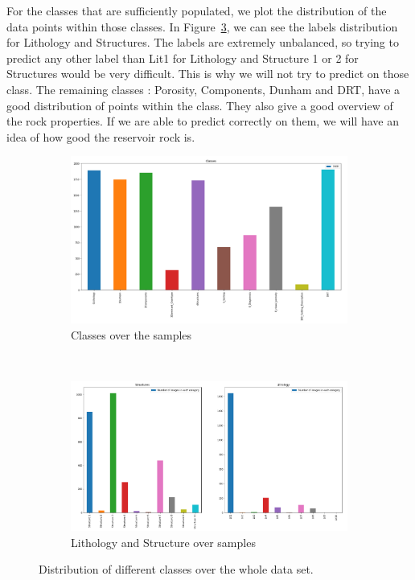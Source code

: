  For the classes that are sufficiently populated, we plot the distribution of the data points within those classes. In Figure~\ref{fig:litandstruct}, we can see the labels distribution for Lithology and Structures. The labels are extremely unbalanced, so trying to predict any other label than Lit1 for Lithology and Structure 1 or 2 for Structures would be very difficult. This is why we will not try to predict on those class. 
 The remaining classes : Porosity, Components, Dunham and DRT, have a good distribution of points within the class. They also give a good overview of the rock properties. If we are able to predict correctly on them, we will have an idea of how good the reservoir rock is. 
\begin{figure}
\begin{subfigure}{1\textwidth}
  \centering
  \includegraphics[width=.8\linewidth]{figures/03-classes.png}
  \caption{Classes over the samples}
  \label{fig:classes}
\end{subfigure}%
\\
\begin{subfigure}{1\textwidth}
  \centering
  \includegraphics[width=.8\linewidth]{figures/03-boob.PNG}
  \caption{Lithology and Structure over samples}
  \label{fig:litandstruct}
\end{subfigure}
\caption[Classes distributions]{Distribution of different classes over the whole data set.}
\end{figure}


